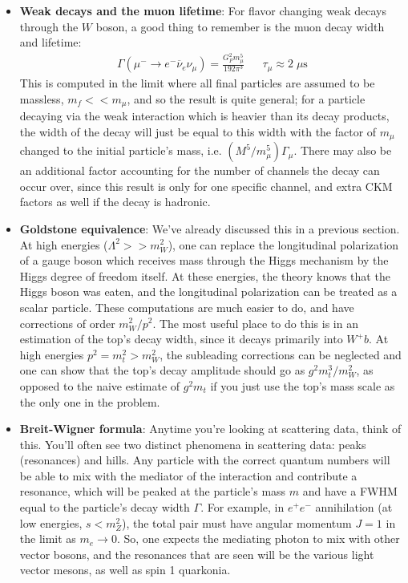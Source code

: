 \documentclass[11pt, oneside]{article}   	%
\theoremstyle{definition}
\numberwithin{equation}{subsection}		%
\begin{document}
\begin{itemize}
\item \textbf{Weak decays and the muon lifetime}: For flavor changing weak decays through the $W$ boson, a good thing to remember is 
the muon decay width and lifetime:
\begin{align}
	\Gamma(\mu^-\rightarrow e^-\overline\nu_e \nu_\mu) = \frac{G_F^2 m_\mu^5}{192\pi^3} && \tau_\mu\approx 2\;\mu\mathrm{s}
\end{align}
This is computed in the limit where all final particles are assumed to be massless, $m_f << m_\mu$, and so the result is quite general; 
for a particle decaying via the weak interaction which is heavier than its decay products, the width of the decay will just be equal to this 
width with the factor of $m_\mu$ changed to the initial particle's mass, i.e. $(M^5 / m_\mu^5)\Gamma_\mu$. There may also be an 
additional factor accounting for the number of channels the decay can occur over, since this result is only for one specific channel, and 
extra CKM factors as well if the decay is hadronic. 

\item \textbf{Goldstone equivalence}: We've already discussed this in a previous section. At high energies ($\Lambda^2 >> m_W^2$), 
one can replace the longitudinal polarization of a gauge boson which receives mass through the Higgs mechanism by the Higgs degree 
of freedom itself. At these energies, the theory knows that the Higgs boson was eaten, and the longitudinal polarization can be treated 
as a scalar particle. These computations are much easier to do, and have corrections of order $m_W^2  / p^2$. The most useful place 
to do this is in an estimation of the top's decay width, since it decays primarily into $W^+ b$. At high energies $p^2 = m_t^2 > m_W^2$, 
the subleading corrections can be neglected and one can show that the top's decay amplitude should go as $g^2 m_t^3 / m_W^2$, as 
opposed to the naive estimate of $g^2 m_t$ if you just use the top's mass scale as the only one in the problem. 

\item \textbf{Breit-Wigner formula}: Anytime you're looking at scattering data, think of this. You'll often see two distinct phenomena in scattering 
data: peaks (resonances) and hills. Any particle with the correct quantum numbers will be able to mix with the mediator of the interaction and 
contribute a resonance, which will be peaked at the particle's mass $m$ and have a FWHM equal to the particle's decay width $\Gamma$. 
For example, in $e^+ e^-$ annihilation (at low energies, $s < m_Z^2$), the total pair must have angular momentum $J = 1$ in the limit 
as $m_e\rightarrow 0$. So, one expects the mediating photon to mix with other vector bosons, and the resonances that are seen will be 
the various light vector mesons, as well as spin 1 quarkonia. 


\end{itemize}
\end{document}
